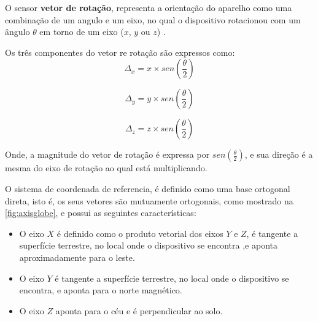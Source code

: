 O sensor \textbf{vetor de rotação}, representa a orientação do aparelho como uma combinação de um angulo e um eixo, no qual o dispositivo rotacionou com um ângulo $\theta$ em torno de um eixo ($x$, $y$ ou $z$) . \par
Os três componentes do vetor re rotação são expressos como:\\

\begin{equation}
\Delta_x = x \times sen(\frac{\theta}{2})
\label{eq:vec_rot_x}
\end{equation}

\begin{equation}
\Delta_y = y \times sen(\frac{\theta}{2})
\label{eq:vec_rot_y}
\end{equation}

\begin{equation}
\Delta_z = z \times sen(\frac{\theta}{2})
\label{eq:vec_rot_z}
\end{equation}

Onde, a magnitude do vetor de rotação é expressa por $sen(\frac{\theta}{2})$, e sua direção é a mesma do eixo de rotação ao qual está multiplicando.\par

O sistema de coordenada de referencia, é definido como uma base ortogonal direta, isto é, os seus vetores são mutuamente ortogonais, como mostrado na \autoref{fig:axisglobe}, e possui as seguintes características:\par
\begin{itemize}
\item O eixo $X$ é definido como o produto vetorial dos eixos $Y$ e $Z$, é tangente a superfície terrestre, no local onde o dispositivo se encontra ,e aponta aproximadamente para o leste.\par

\item O eixo $Y$ é tangente a superfície terrestre, no local onde o dispositivo se encontra, e aponta para o norte magnético. \par

\item O eixo $Z$ aponta para o céu e é perpendicular ao solo.
\end{itemize}